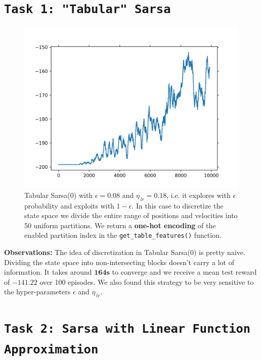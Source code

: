 \documentclass[11pt]{article}
\begin{document}
    \pagebreak
    
    \section{\texttt{Task 1: "Tabular" Sarsa}}
    
    \begin{figure}[htbp!]
        \centering
        \includegraphics[width=0.7\linewidth]{T1.jpg}
        \caption{Tabular Sarsa(0) with $\epsilon=0.08$ and $\eta_{\,lr}=0.18$, i.e. it explores with $\epsilon$ probability and exploits with $1 - \epsilon$. In this case to discretize the state space we divide the entire range of positions and velocities into 50 uniform partitions. We return a \textbf{one-hot encoding} of the enabled partition index in the \texttt{get_table_features()} function.}
    \end{figure}%
    \textbf{Observations: } The idea of discretization in Tabular Sarsa(0) is pretty naive. Dividing the state space into non-intersecting blocks doesn't carry a lot of information. It takes around $\mathbf{164s}$ to converge and we receive a mean test reward of $\mathbf{-141.22}$ over 100 episodes. We also found this strategy to be very sensitive to the hyper-parameters $\epsilon$ and $\eta_{\,lr}$.
    
    \clearpage
    \section{\texttt{Task 2: Sarsa with Linear Function Approximation}}
    
\end{document}
